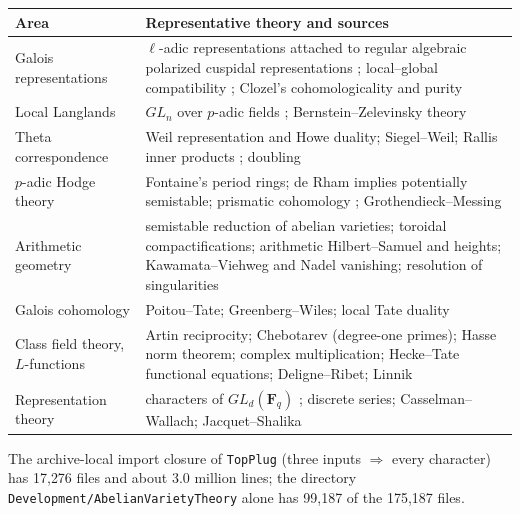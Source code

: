\documentclass[11pt]{article}
\newcommand{\Lean}[1]{\texttt{\small #1}}
\begin{document}
\medskip
\noindent\begin{tabularx}{\linewidth}{@{}lX@{}}
\toprule
Area & Representative theory and sources\\
\midrule
Galois representations & $\ell$-adic representations attached to regular algebraic polarized cuspidal representations \cite{shin}; local--global compatibility \cite{caraiani12,caraiani14,ty}; Clozel's cohomologicality and purity\\
Local Langlands & $GL_n$ over $p$-adic fields \cite{ht,henniart}; Bernstein--Zelevinsky theory\\
Theta correspondence & Weil representation and Howe duality; Siegel--Weil; Rallis inner products \cite{rallis}; doubling \cite{psr}\\
$p$-adic Hodge theory & Fontaine's period rings; de Rham implies potentially semistable; prismatic cohomology \cite{bs}; Grothendieck--Messing\\
Arithmetic geometry & semistable reduction of abelian varieties; toroidal compactifications; arithmetic Hilbert--Samuel and heights; Kawamata--Viehweg and Nadel vanishing; resolution of singularities\\
Galois cohomology & Poitou--Tate; Greenberg--Wiles; local Tate duality\\
Class field theory, $L$-functions & Artin reciprocity; Chebotarev (degree-one primes); Hasse norm theorem; complex multiplication; Hecke--Tate functional equations; Deligne--Ribet; Linnik\\
Representation theory & characters of $GL_d(\mathbf F_q)$ \cite{green}; discrete series; Casselman--Wallach; Jacquet--Shalika\\
\bottomrule
\end{tabularx}

\medskip
The archive-local import closure of \Lean{TopPlug} (three inputs $\Rightarrow$ every character) has 17{,}276 files and about 3.0 million lines; the directory \Lean{Development/AbelianVarietyTheory} alone has 99{,}187 of the 175{,}187 files.
\end{document}
